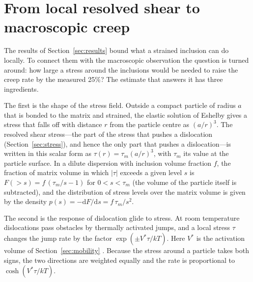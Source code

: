 \section{From local resolved shear to macroscopic creep}
\label{sec:bridge}

The results of Section~\ref{sec:results} bound what a strained inclusion can
do locally. To connect them with the macroscopic observation the question is
turned around: how large a stress around the inclusions would be needed to
raise the creep rate by the measured 25\%? The estimate that answers it has
three ingredients.

The first is the shape of the stress field. Outside a compact particle of
radius $a$ that is bonded to the matrix and strained, the elastic solution of
Eshelby \cite{Eshelby1957} gives a stress that falls off with distance $r$
from the particle centre as $(a/r)^{3}$. The resolved shear stress---the part
of the stress that pushes a dislocation (Section~\ref{sec:stress}), and hence
the only part that pushes a dislocation---is written in this scalar form as
$\tau(r)=\tau_m(a/r)^{3}$, with $\tau_m$ its value at the particle surface. In
a dilute dispersion with inclusion volume fraction $f$, the fraction of matrix
volume in which $|\tau|$ exceeds a given level $s$ is
$F(>s)=f\,(\tau_m/s-1)$ for $0<s<\tau_m$ (the volume of the particle itself
is subtracted), and the distribution of stress levels over the matrix volume
is given by the density $p(s)=-\mathrm{d}F/\mathrm{d}s=f\,\tau_m/s^{2}$.

The second is the response of dislocation glide to stress. At room
temperature dislocations pass obstacles by thermally activated jumps, and a
local stress $\tau$ changes the jump rate by the factor
$\exp(\pm V^{*}\tau/kT)$. Here $V^{*}$ is the activation volume of Section~\ref{sec:mobility}
\cite{CaillardMartin2003}. Because the stress around a particle
takes both signs, the two directions are weighted equally and the rate is
proportional to $\cosh(V^{*}\tau/kT)$.


